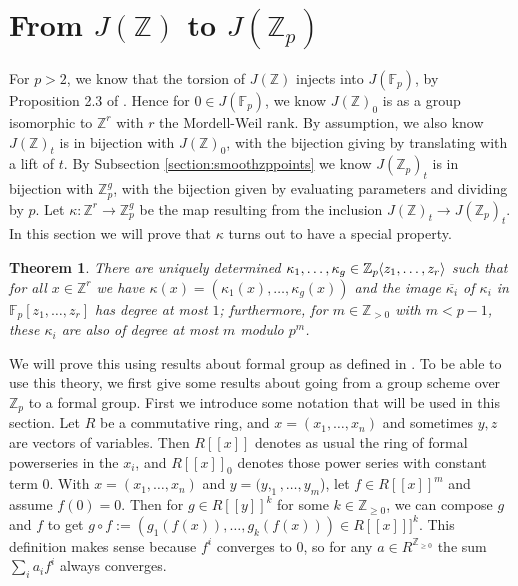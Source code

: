 \documentclass[12pt]{article}
\newcommand{\Z}{\mathbb{Z}}
\newcommand{\F}{\mathbb{F}}
\renewcommand{\angle}[1]{\hspace{-2pt}\left\langle #1 \right\rangle}
\theoremstyle{plain}
\newtheorem{thm}{Theorem}[section] %
\theoremstyle{definition}
\theoremstyle{remark}
\begin{document}
\section{From \texorpdfstring{$J(\Z)$}{J(Z)} to \texorpdfstring{$J(\Z_p)$}{J(Z\_p)}}
\label{section:kappa}
For $p > 2$, we know that the torsion of $J(\Z)$ injects into $J(\F_p)$, by Proposition 2.3 of \cite{pierre2000}. Hence for $0 \in J(\F_p)$, we know $J(\Z)_0$ is as a group isomorphic to $\Z^r$ with $r$ the Mordell-Weil rank. By assumption, we also know $J(\Z)_t$ is in bijection with $J(\Z)_0$, with the bijection giving by translating with a lift of $t$. By Subsection \ref{section:smoothzppoints} we know $J(\Z_p)_t$ is in bijection with $\Z_p^{g}$, with the bijection given by evaluating parameters and dividing by $p$. Let $\kappa: \Z^r \to \Z_p^g$ be the map resulting from the inclusion $J(\Z)_t \to J(\Z_p)_t$. In this section we will prove that $\kappa$ turns out to have a special property.

\begin{thm}
\label{thm:kappanice}
There are uniquely determined $\kappa_1,\dots,\kappa_g \in \Z_p\angle{z_1,\dots,z_r}$ such that for all $x \in \Z^r$ we have $\kappa(x) = (\kappa_1(x),\dots,\kappa_g(x))$ and the image $\overline{\kappa_i}$ of $\kappa_i$ in $\F_p[z_1,\dots,z_r]$ has degree at most $1$; furthermore, for $m \in \Z_{>0}$ with $m<p-1$, these $\kappa_i$ are also of degree at most $m$ modulo $p^m$.
\end{thm}

We will prove this using results about formal group as defined in \citep{honda70}. To be able to use this theory, we first give some results about going from a group scheme over $\Z_p$ to a formal group.
First we introduce some notation that will be used in this section. Let $R$ be a commutative ring, and $x = (x_1,\dots,x_n)$ and sometimes $y,z$ are vectors of variables. Then $R[[x]]$ denotes as usual the ring of formal powerseries in the $x_i$, and $R[[x]]_0$ denotes those power series with constant term $0$. With $x = (x_1,\dots,x_n)$ and $y = (y,_1,\dots,y_m$), let $f \in R[[x]]^m$ and assume $f(0) = 0$. Then for $g \in R[[y]]^k$ for some $k\in\Z_{\geq 0}$, we can compose $g$ and $f$ to get $g\circ f := (g_1(f(x)),\dots,g_k(f(x)))\in R[[x]]]^k$. This definition makes sense because $f^i$ converges to $0$, so for any $a \in R^{\Z_{\geq 0}} $ the sum $\sum_i a_i f^i$ always converges. 
\end{document}
